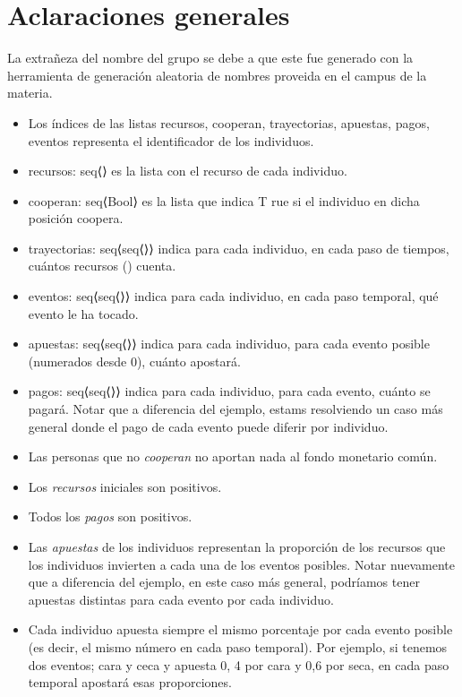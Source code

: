 \documentclass[10pt,a4paper]{article}
\begin{document}
\maketitle

\section{Aclaraciones generales}
 La extrañeza del nombre del grupo se debe a que
 este fue generado con la herramienta de generación aleatoria de nombres proveida en el campus
 de la materia.

\begin{itemize}
	\item Los índices de las listas recursos, cooperan, trayectorias, apuestas, pagos, eventos representa el identificador de los
    individuos.
	\item recursos: seq⟨\real⟩ es la lista con el recurso de cada individuo.
	\item cooperan: seq⟨Bool⟩ es la lista que indica T rue si el individuo en dicha posición coopera.
	\item trayectorias: seq⟨seq⟨\real⟩⟩ indica para cada individuo, en cada paso de tiempos, cuántos recursos (\real) cuenta.
	\item eventos: seq⟨seq⟨\nat⟩⟩ indica para cada individuo, en cada paso temporal, qué evento le ha tocado.
	\item apuestas: seq⟨seq⟨\real⟩⟩ indica para cada individuo, para cada evento posible (numerados desde 0), cuánto apostará.
	\item pagos: seq⟨seq⟨\real⟩⟩ indica para cada individuo, para cada evento, cuánto se pagará. Notar que a diferencia del ejemplo, estams resolviendo un caso más general donde el pago de cada evento puede diferir por individuo.
	\item Las personas que no \textit{cooperan} no aportan nada al fondo monetario común.
	\item Los \textit{recursos} iniciales son positivos.
	\item Todos los \textit{pagos} son positivos.
	\item Las \textit{apuestas} de los individuos representan la proporción de los recursos que los individuos invierten a cada una de los eventos posibles. Notar nuevamente que a diferencia del ejemplo, en este caso más general, podríamos tener apuestas distintas para cada evento por cada individuo.
	\item Cada individuo apuesta siempre el mismo porcentaje por cada evento posible (es decir, el mismo número en cada paso temporal). Por ejemplo, si tenemos dos eventos; cara y ceca y apuesta 0, 4 por cara y 0,6 por seca, en cada paso temporal apostará esas proporciones.
    
\end{itemize}
\end{document}
